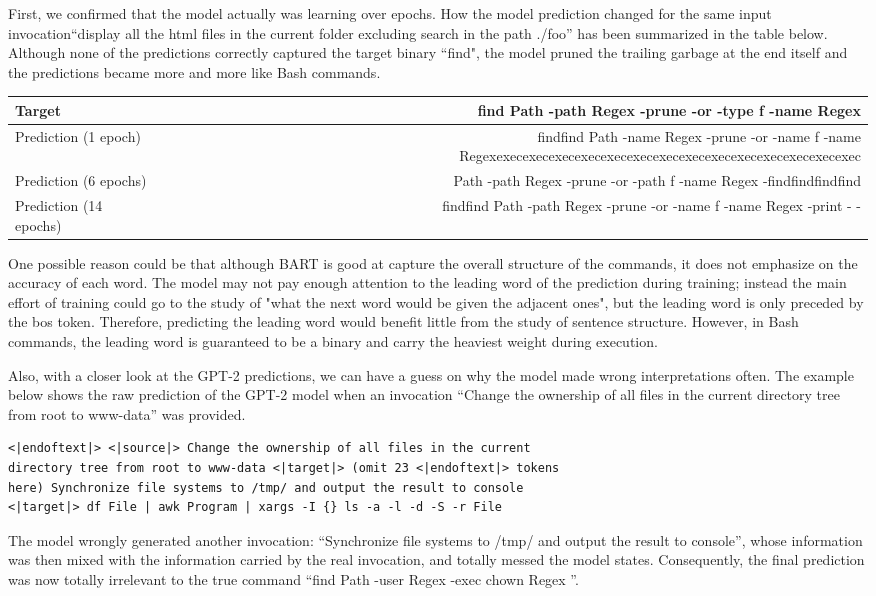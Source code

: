 First, we confirmed that the model actually was learning over epochs. How the model prediction changed for the same input invocation``display all the html files in the current folder excluding search in the path ./foo'' has been summarized in the table below. Although none of the predictions correctly captured the target binary ``find", the model pruned the trailing garbage at the end itself and the predictions became more and more like Bash commands.

\begin{center}
\begin{tabular}{|M|N|}
    \hline
     Target&  find Path -path Regex -prune -or -type f -name Regex\\
     \hline
     Prediction (1 epoch)&  findfind Path -name Regex -prune -or -name f -name Regexexecexecexecexecexecexecexecexecexecexecexecexecexecexec\\
     \hline
     Prediction (6 epochs)&  Path -path Regex -prune -or -path f -name Regex -findfindfindfind\\
     \hline
     Prediction (14 epochs)& findfind Path -path Regex -prune -or -name f -name Regex -print - -\\
     \hline
\end{tabular}
\end{center}

One possible reason could be that although BART is good at capture the overall structure of the commands, it does not emphasize on the accuracy of each word. The model may not pay enough attention to the leading word of the prediction during training; instead the main effort of training could go to the study of "what the next word would be given the adjacent ones", but the leading word is only preceded by the bos token. Therefore, predicting the leading word would benefit little from the study of sentence structure. However, in Bash commands, the leading word is guaranteed to be a binary and carry the heaviest weight during execution.

Also, with a closer look at the GPT-2 predictions, we can have a guess on why the model made wrong interpretations often.  The example below shows the raw prediction of the GPT-2 model when an invocation ``Change the ownership of all files in the current directory tree from root to www-data'' was provided.

\begin{verbatim}
<|endoftext|> <|source|> Change the ownership of all files in the current 
directory tree from root to www-data <|target|> (omit 23 <|endoftext|> tokens 
here) Synchronize file systems to /tmp/ and output the result to console 
<|target|> df File | awk Program | xargs -I {} ls -a -l -d -S -r File
\end{verbatim}
The model wrongly generated another invocation: ``Synchronize file systems to /tmp/ and output the result to console'', whose information was then mixed with the information carried by the real invocation, and totally messed the model states. Consequently, the final prediction was now totally irrelevant to the true command ``find Path -user Regex -exec chown Regex {}''.


